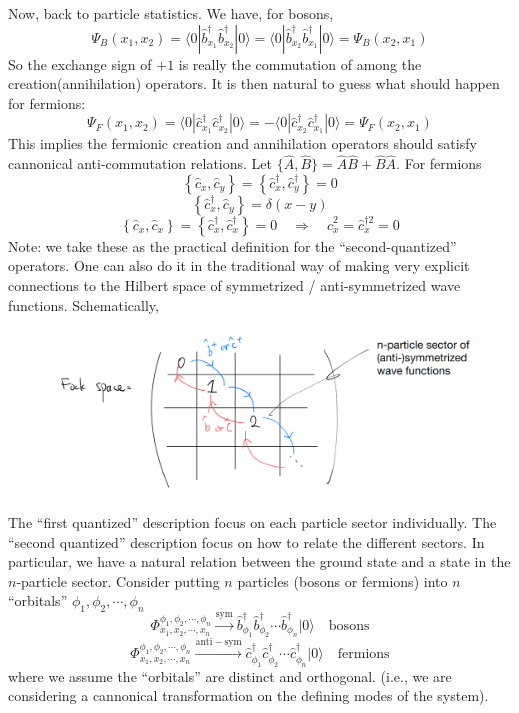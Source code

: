 Now, back to particle statistics. We have, for bosons,
\[ \Psi _B\left( x_1,x_2 \right) =\langle 0|\hat{b}_{x_1}^{\dagger}\hat{b}_{x_2}^{\dagger}|0\rangle =\langle 0|\hat{b}_{x_2}^{\dagger}\hat{b}_{x_1}^{\dagger}|0\rangle =\Psi _B\left( x_2,x_1 \right) \]
So the exchange sign of $+1$ is really the commutation of among the creation(annihilation) operators. It is then natural to guess what should happen for fermions:
\[ \Psi _F\left( x_1,x_2 \right) =\langle 0|\hat{c}_{x_1}^{\dagger}\hat{c}_{x_2}^{\dagger}|0\rangle =-\langle 0|\hat{c}_{x_2}^{\dagger}\hat{c}_{x_1}^{\dagger}|0\rangle =\Psi _F\left( x_2,x_1 \right)  \]
This implies the fermionic creation and annihilation operators should satisfy cannonical anti-commutation relations. Let $\{\hat{A},\hat{B}\}=\hat{A}\hat{B}+\hat{B}\hat{A}$. For fermions
\[ \left\{ \hat{c}_x,\hat{c}_y \right\} =\left\{ \hat{c}_{x}^{\dagger},\hat{c}_{y}^{\dagger} \right\} =0 \]
\[ \left\{ \hat{c}_{x}^{\dagger},\hat{c}_y \right\} =\delta \left( x-y \right) \]
\[ \left\{ \hat{c}_x,\hat{c}_x \right\} =\left\{ \hat{c}_{x}^{\dagger},\hat{c}_{x}^{\dagger} \right\} =0\quad \Rightarrow \quad \hat{c}_{x}^{2}=\hat{c}_{x}^{\dagger 2}=0\]
Note: we take these as the practical definition for the ``second-quantized'' operators. One can also do it in the traditional way of making very explicit connections to the Hilbert space of symmetrized / anti-symmetrized wave functions. Schematically,
\begin{figure}[ht]
    \centering
    \includegraphics[width=\textwidth]{jupyterbook/data/fig/lec04-fig00.png}
\end{figure}
The ``first quantized'' description focus on each particle sector individually. The ``second quantized'' description focus on how to relate the different sectors. In particular, we have a natural relation between the ground state and a state in the $n$-particle sector. Consider putting $n$ particles (bosons or fermions) into $n$ ``orbitals'' $\phi_1,\phi_2,\cdots,\phi_n$
\[ \Phi _{x_1,x_2,\cdots ,x_n}^{\phi _1,\phi _2,\cdots ,\phi _n}\xrightarrow{\mathrm{sym}}\hat{b}_{\phi _1}^{\dagger}\hat{b}_{\phi _2}^{\dagger}\cdots \hat{b}_{\phi _n}^{\dagger}|0\rangle \quad \mathrm{bosons}\]
\[ \Phi _{x_1,x_2,\cdots ,x_n}^{\phi _1,\phi _2,\cdots ,\phi _n}\xrightarrow{\mathrm{anti}-\mathrm{sym}}\hat{c}_{\phi _1}^{\dagger}\hat{c}_{\phi _2}^{\dagger}\cdots \hat{c}_{\phi _n}^{\dagger}|0\rangle \quad \mathrm{fermions}\]
where we assume the ``orbitals'' are distinct and orthogonal. (i.e., we are considering a cannonical transformation on the defining modes of the system).

